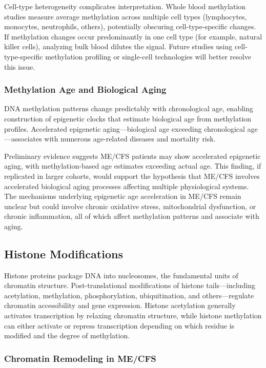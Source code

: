 Cell-type heterogeneity complicates interpretation. Whole blood methylation studies measure average methylation across multiple cell types (lymphocytes, monocytes, neutrophils, others), potentially obscuring cell-type-specific changes. If methylation changes occur predominantly in one cell type (for example, natural killer cells), analyzing bulk blood dilutes the signal. Future studies using cell-type-specific methylation profiling or single-cell technologies will better resolve this issue.

\subsubsection{Methylation Age and Biological Aging}

DNA methylation patterns change predictably with chronological age, enabling construction of epigenetic clocks that estimate biological age from methylation profiles. Accelerated epigenetic aging---biological age exceeding chronological age---associates with numerous age-related diseases and mortality risk.

Preliminary evidence suggests ME/CFS patients may show accelerated epigenetic aging, with methylation-based age estimates exceeding actual age. This finding, if replicated in larger cohorts, would support the hypothesis that ME/CFS involves accelerated biological aging processes affecting multiple physiological systems. The mechanisms underlying epigenetic age acceleration in ME/CFS remain unclear but could involve chronic oxidative stress, mitochondrial dysfunction, or chronic inflammation, all of which affect methylation patterns and associate with aging.

\subsection{Histone Modifications}
\label{sec:histone-modifications}

Histone proteins package DNA into nucleosomes, the fundamental units of chromatin structure. Post-translational modifications of histone tails---including acetylation, methylation, phosphorylation, ubiquitination, and others---regulate chromatin accessibility and gene expression. Histone acetylation generally activates transcription by relaxing chromatin structure, while histone methylation can either activate or repress transcription depending on which residue is modified and the degree of methylation.

\subsubsection{Chromatin Remodeling in ME/CFS}

